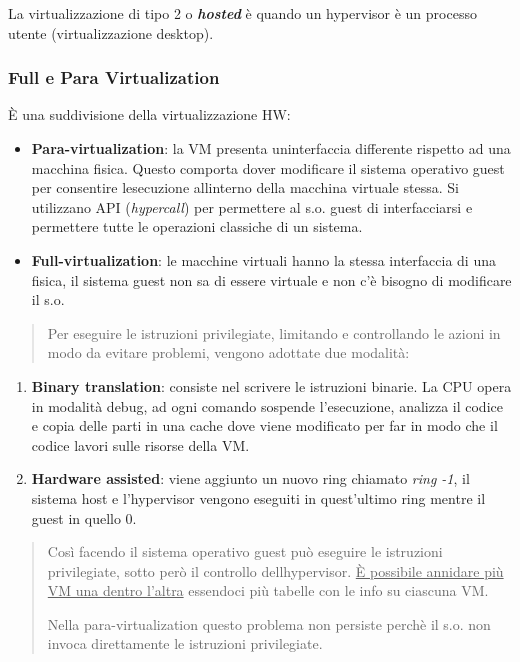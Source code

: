 La virtualizzazione di tipo 2 o \emph{\textbf{hosted}} è quando un
hypervisor è un processo utente (virtualizzazione desktop).

\subsubsection{Full e Para
Virtualization}\label{full-e-para-virtualization}

È una suddivisione della virtualizzazione HW:

\begin{itemize}
\item
  \textbf{Para-virtualization}: la VM presenta
  un\textquotesingle interfaccia differente rispetto ad una macchina
  fisica. Questo comporta dover modificare il sistema operativo guest
  per consentire l\textquotesingle esecuzione
  all\textquotesingle interno della macchina virtuale stessa. Si
  utilizzano API (\emph{hypercall}) per permettere al s.o. guest di
  interfacciarsi e permettere tutte le operazioni classiche di un
  sistema.
\item
  \textbf{Full-virtualization}: le macchine virtuali hanno la stessa
  interfaccia di una fisica, il sistema guest non sa di essere virtuale
  e non c'è bisogno di modificare il s.o.
\end{itemize}

\begin{quote}
Per eseguire le istruzioni privilegiate, limitando e controllando le
azioni in modo da evitare problemi, vengono adottate due modalità:
\end{quote}

\begin{enumerate}
\def\labelenumi{\arabic{enumi}.}
\item
  \textbf{Binary translation}: consiste nel scrivere le istruzioni
  binarie. La CPU opera in modalità debug, ad ogni comando sospende
  l'esecuzione, analizza il codice e copia delle parti in una cache dove
  viene modificato per far in modo che il codice lavori sulle risorse
  della VM.
\item
  \textbf{Hardware assisted}: viene aggiunto un nuovo ring chiamato
  \emph{ring -1}, il sistema host e l'hypervisor vengono eseguiti in
  quest'ultimo ring mentre il guest in quello 0.
\end{enumerate}

\begin{quote}
Così facendo il sistema operativo guest può eseguire le istruzioni
privilegiate, sotto però il controllo dell\textquotesingle hypervisor.
\ul{È possibile annidare più VM una dentro l'altra} essendoci più
tabelle con le info su ciascuna VM.

Nella para-virtualization questo problema non persiste perchè il s.o.
non invoca direttamente le istruzioni privilegiate.
\end{quote}

